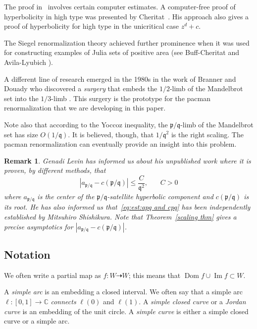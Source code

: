 \documentclass[]{amsart}
\newcommand{\Dom}{\operatorname {Dom}}
\renewcommand{\sp}{{\ \ }}
\renewcommand{\Im}{\operatorname {Im}}
\newcommand{\pp}{\mathfrak{p}}
\renewcommand{\qq}{\mathfrak{q}}
\newcommand{\C}{\mathbb{C}}
\newtheorem{rem}[thm]{Remark}
\theoremstyle{remark}
\numberwithin{equation}{section}
\theoremstyle{definition}
\begin{document}
The proof in~\cite{IS} involves certain computer estimates. A computer-free proof of hyperbolicity in high type was presented by Cheritat~\cite{Che:nearpar}. His approach also gives a proof of hyperbolicity for high type in the unicritical case $z^d+c$.

The Siegel renormalization theory achieved further prominence when it was used for 
constructing examples of Julia sets of positive area 
(see Buff-Cheritat \cite{BC} and Avila-Lyubich \cite{AL-posmeas}). 

A different line of research emerged in the 1980s in the work of Branner and Douady
who discovered a {\em surgery} that embeds the $1/2$-limb of the Mandelbrot set into the
$1/3$-limb \cite{BD}. This surgery is the prototype for the pacman renormalization 
that we are developing in this paper. 

Note also that according to the Yoccoz inequality, the $\pp/\qq$-limb of the Mandelbrot set has size
 $O(1/\qq)$. It is believed, though, that  $ 1/\qq^2 $  is the right scaling.
 The pacman renormalization can eventually provide an insight into this problem.  

\begin{rem}
Genadi Levin has informed us about his unpublished work where it is proven, by different methods, that 
\begin{equation}
\label{eq:est:apq and cpq} |a_{\pp/\qq}-c(\pp/\qq)| \le \frac{C}{ \qq^2}, \sp\sp\sp\sp  C>0 
\end{equation} where $a_{\pp/\qq}$ is the center of the $\pp/\qq$-satellite hyperbolic component and $c(\pp/\qq)$ is its root. He has also informed us that~\eqref{eq:est:apq and cpq} has been independently established by Mitsuhiro Shishikura. Note that Theorem~\ref{scaling thm} gives a precise asymptotics for $|a_{\pp/\qq}-c(\pp/\qq)|$.
\end{rem}

\subsection{Notation}
\label{ss:Notations}
We often write a partial map as $f\colon W\dashrightarrow W$; this means that $\Dom f\cup \Im f \subset W$. 



A \emph{simple arc} is an embedding a closed interval. We often say that a simple arc $\ell\colon [0,1]\to \C$ \emph{connects} $\ell(0)$ and $\ell(1)$. A \emph{simple closed curve} or a \emph{Jordan curve} is an embedding of the unit circle. A \emph{simple curve} is either a simple closed curve or a simple arc.
\end{document}

